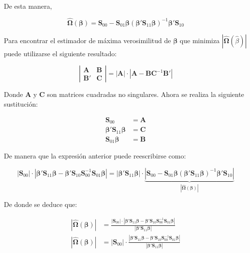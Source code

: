 \documentclass[12pt, twoside]{book}\usepackage[]{graphicx}\usepackage[]{color}
\numberwithin{equation}{section}
\numberwithin{theorem}{section}
\numberwithin{teorema}{section}
\numberwithin{defi}{section}
\numberwithin{prop}{section}
\numberwithin{defi}{section}
\theoremstyle{plain}
\begin{document}
De esta manera, 

\begin{equation}
\hat{\boldsymbol{\Omega}}(\boldsymbol{\beta}) = 
\mathbf{S}_{00}-\mathbf{S}_{01}\boldsymbol{\beta}(\boldsymbol{\beta}'
\mathbf{S}_{11}\boldsymbol{\beta})^{-1}\boldsymbol{\beta}'\mathbf{S}_{10}
\end{equation}

Para encontrar el estimador de máxima verosimilitud de $\boldsymbol{\beta}$ que minimiza $|\hat{\boldsymbol{\Omega}}(\hat{\beta})|$ puede utilizarse el siguiente resultado: 

\begin{equation}
\left|\begin{array}{cc} \mathbf{A} & \mathbf{B} \\ \mathbf{B}' & \mathbf{C} \end{array}\right| = |\mathbf{A}|\cdot |\mathbf{A}-\mathbf{B}\mathbf{C}^{-1}\mathbf{B}'|
\end{equation}

Donde $\mathbf{A}$ y $\mathbf{C}$ son matrices cuadradas no singulares. Ahora se realiza la siguiente sustitución: 

\begin{align}
\mathbf{S}_{00} & = \mathbf{A} \\ 
\boldsymbol{\beta}'\mathbf{S}_{11}\boldsymbol{\beta} & = \mathbf{C} \\ 
\mathbf{S}_{01}\boldsymbol{\beta} & = \mathbf{B}
\end{align}


De manera que la expresión anterior puede reescribirse como: 

\begin{equation}
|\mathbf{S}_{00}|\cdot |\boldsymbol{\beta}'\mathbf{S}_{11}\boldsymbol{\beta}-\boldsymbol{\beta}'\mathbf{S}_{10}\mathbf{S}_{00}^{-1}\mathbf{S}_{01}\boldsymbol{\beta}| = |\boldsymbol{\beta}'\mathbf{S}_{11}\boldsymbol{\beta}|\cdot 
\underbrace{|\mathbf{S}_{00}-\mathbf{S}_{01}\boldsymbol{\beta}(\boldsymbol{\beta}'\mathbf{S}_{11}\boldsymbol{\beta})^{-1}\boldsymbol{\beta}'\mathbf{S}_{10}|}_{|\hat{\boldsymbol{\Omega}}(\boldsymbol{\beta})|}
\end{equation}

De donde se deduce que: 

\begin{align}
|\hat{\boldsymbol{\Omega}}(\boldsymbol{\beta})| & = \frac{|\mathbf{S}_{00}|\cdot |\boldsymbol{\beta}'\mathbf{S}_{11}\boldsymbol{\beta}-\boldsymbol{\beta}'\mathbf{S}_{10}\mathbf{S}_{00}^{-1}\mathbf{S}_{01}\boldsymbol{\beta}|}{|\boldsymbol{\beta}'\mathbf{S}_{11}\boldsymbol{\beta}|} \\
|\hat{\boldsymbol{\Omega}}(\boldsymbol{\beta})| & = |\mathbf{S}_{00}|\cdot\frac{ |\boldsymbol{\beta}'\mathbf{S}_{11}\boldsymbol{\beta}-\boldsymbol{\beta}'\mathbf{S}_{10}\mathbf{S}_{00}^{-1}\mathbf{S}_{01}\boldsymbol{\beta}|}{|\boldsymbol{\beta}'\mathbf{S}_{11}\boldsymbol{\beta}|}
\end{align}
\end{document}
